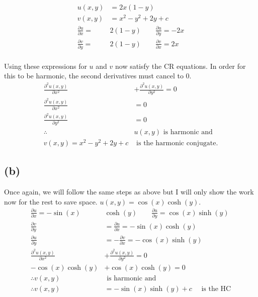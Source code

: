 \documentclass{article}
\let\oldcos\cos
\let\oldsin\sin
\let\oldcosh\cosh
\let\oldsinh\sinh
\renewcommand{\cos}[1]{\oldcos\left(#1\right)}
\renewcommand{\sin}[1]{\oldsin\left(#1\right)}
\renewcommand{\cosh}[1]{\oldcosh\left(#1\right)}
\renewcommand{\sinh}[1]{\oldsinh\left(#1\right)}
\newcommand{\parder}[2]{\frac{\partial#1}{\partial#2}}
\newcommand{\secparder}[2]{\frac{\partial^2#1}{\partial#2^2}}
\begin{document}
\begin{align*}
  u(x,y) &= 2x(1-y)\\
  v(x,y) &= x^2-y^2 + 2y + c\\
  \parder{u}{x} = &2(1-y) \quad \quad \parder{u}{y} = -2x\\
  \parder{v}{y} = &2(1-y)  \quad \quad \parder{v}{x} = 2x \\
\end{align*}

Using these expressions for $u$ and $v$ now satisfy the CR equations. In order for this to be harmonic, the second derivatives must cancel to 0.
\begin{align*}
  \secparder{u(x,y)}{x} &+ \secparder{u(x,y)}{y} = 0\\
  \secparder{u(x,y)}{x} &= 0\\
  \secparder{u(x,y)}{y} &= 0 \\
  \therefore &u(x,y) \text{ is harmonic and }\\
  v(x,y) = x^2-y^2 + 2y + c &\text{ is the harmonic conjugate.}
\end{align*}
\subsection*{(b)}
Once again, we will follow the same steps as above but I will only show the work now for the rest to save space. $u(x,y) = \cos{x}\cosh{y}$.
\begin{align*}
  \parder{u}{x} = -\sin{x}&\cosh{y} \quad \quad \parder{u}{y} = \cos{x}\sinh{y}\\
  \parder{v}{y} &= \parder{u}{x} = -\sin{x}\cosh{y}\\
  \parder{u}{y} &=-\parder{v}{x} = -\cos{x}\sinh{y}\\
  \secparder{u(x,y)}{x} &+ \secparder{u(x,y)}{y} = 0\\
-\cos{x}\cosh{y} &+ \cos{x}\cosh{y} = 0 \\
  \therefore v(x,y) & \text{ is harmonic and}\\
  \therefore v(x,y) &= -\sin{x}\sinh{y} + c \quad \text{ is the HC}
\end{align*}
\end{document}
